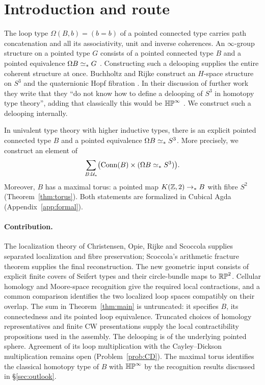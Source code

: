 \section{Introduction and route}\label{sec:intro}

The loop type $\Omega(B,b)=(b=b)$ of a pointed connected type carries path concatenation and all its associativity, unit and inverse coherences. An $\infty$-group structure on a pointed type $G$ consists of a pointed connected type $B$ and a pointed equivalence $\Omega B\simeq_* G$ \cite[\S3]{highergroups}. Constructing such a delooping supplies the entire coherent structure at once. Buchholtz and Rijke construct an $H$-space structure on $S^3$ and the quaternionic Hopf fibration \cite{cayley}. In their discussion of further work they write that they ``do not know how to define a delooping of $S^3$ in homotopy type theory'', adding that classically this would be $\mathbb{HP}^\infty$ \cite[\S6]{cayley}. We construct such a delooping internally.

\begin{theorem}\label{thm:main}
In univalent type theory with higher inductive types, there is an explicit pointed connected type $B$ and a pointed equivalence $\Omega B\simeq_* S^3$. More precisely, we construct an element of
\[
\sum_{B:\mathcal U_*}\bigl(\operatorname{Conn}(B)\times(\Omega B\simeq_* S^3)\bigr).
\]
Moreover, $B$ has a maximal torus: a pointed map $K(\mathbb Z,2)\to_*B$ with fibre $S^2$ (Theorem~\ref{thm:torus}). Both statements are formalized in Cubical Agda (Appendix~\ref{app:formal}).
\end{theorem}

\paragraph{Contribution.}
The localization theory of Christensen, Opie, Rijke and Scoccola \cite{cors} supplies separated localization and fibre preservation; Scoccola's arithmetic fracture theorem \cite{scoccola} supplies the final reconstruction. The new geometric input consists of explicit finite covers of Seifert types and their circle-bundle maps to $\mathbb{RP}^2$. Cellular homology and Moore-space recognition give the required local contractions, and a common comparison identifies the two localized loop spaces compatibly on their overlap. The sum in Theorem~\ref{thm:main} is untruncated: it specifies $B$, its connectedness and its pointed loop equivalence. Truncated choices of homology representatives and finite CW presentations supply the local contractibility propositions used in the assembly. The delooping is of the underlying pointed sphere. Agreement of its loop multiplication with the Cayley--Dickson multiplication remains open (Problem~\ref{prob:CD}). The maximal torus identifies the classical homotopy type of $B$ with $\mathbb{HP}^\infty$ by the recognition results discussed in \S\ref{sec:outlook}.

